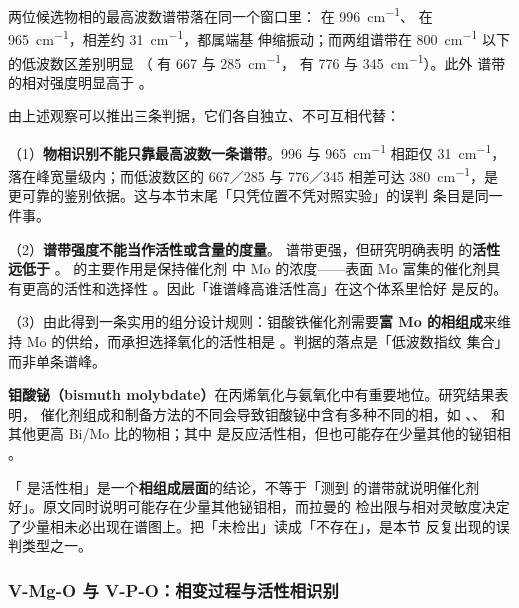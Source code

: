 \begin{obs}
两位候选物相的最高波数谱带落在同一个窗口里： 在 \qty{996}{cm^{-1}}、
 在 \qty{965}{cm^{-1}}，相差约 \qty{31}{cm^{-1}}，都属端基
 伸缩振动；而两组谱带在 \qty{800}{cm^{-1}} 以下的低波数区差别明显
（ 有 667 与 \qty{285}{cm^{-1}}， 有 776 与
\qty{345}{cm^{-1}}）。此外  谱带的相对强度明显高于
。
\end{obs}

\begin{infer}
由上述观察可以推出三条判据，它们各自独立、不可互相代替：

（1）\textbf{物相识别不能只靠最高波数一条谱带}。996 与 \qty{965}{cm^{-1}} 相距仅
\qty{31}{cm^{-1}}，落在峰宽量级内；而低波数区的 667／285 与 776／345 相差可达
\qty{380}{cm^{-1}}，是更可靠的鉴别依据。这与本节末尾「只凭位置不凭对照实验」的误判
条目是同一件事。

（2）\textbf{谱带强度不能当作活性或含量的度量}。 谱带更强，但研究明确表明
 的\textbf{活性远低于} 。 的主要作用是保持催化剂
中 Mo 的浓度——表面 Mo 富集的催化剂具有更高的活性和选择性
。因此「谁谱峰高谁活性高」在这个体系里恰好
是反的。

（3）由此得到一条实用的组分设计规则：钼酸铁催化剂需要\textbf{富 Mo 的相组成}来维持
Mo 的供给，而承担选择氧化的活性相是 。判据的落点是「低波数指纹
集合」而非单条谱峰。
\end{infer}

\textbf{钼酸铋（bismuth molybdate）}在丙烯氧化与氨氧化中有重要地位。研究结果表明，
催化剂组成和制备方法的不同会导致钼酸铋中含有多种不同的相，如
、、 和其他更高 Bi/Mo 比的物相；其中
 是反应活性相，但也可能存在少量其他的铋钼相
。

\begin{pitfall}
「 是活性相」是一个\textbf{相组成层面}的结论，不等于「测到
 的谱带就说明催化剂好」。原文同时说明可能存在少量其他铋钼相，而拉曼的
检出限与相对灵敏度决定了少量相未必出现在谱图上。把「未检出」读成「不存在」，是本节
反复出现的误判类型之一。
\end{pitfall}

\subsubsection{V-Mg-O 与 V-P-O：相变过程与活性相识别}

